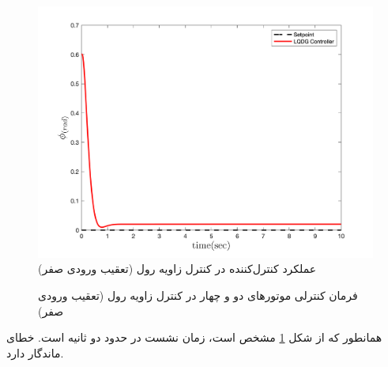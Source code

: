 \begin{figure}[H]
	\includegraphics[width=.48\linewidth]{../Figures/MIL/LQDG/Roll/lqdg_roll_nn.png}
	\centering
	\caption{عملكرد کنترل‌کننده  در کنترل زاويه رول (تعقیب ورودی صفر)}
	\label{lqdg_roll_fig_simulation}
\end{figure}
\begin{figure}[H]
	\centering
	\caption{‫‪فرمان کنترلی موتورهای دو و چهار در کنترل زاویه رول (تعقیب ورودی صفر)}
\end{figure}

همانطور که از شکل
\ref{lqdg_roll_fig_simulation}
مشخص است، زمان نشست در حدود دو ثانیه است. خطای ماندگار دارد.